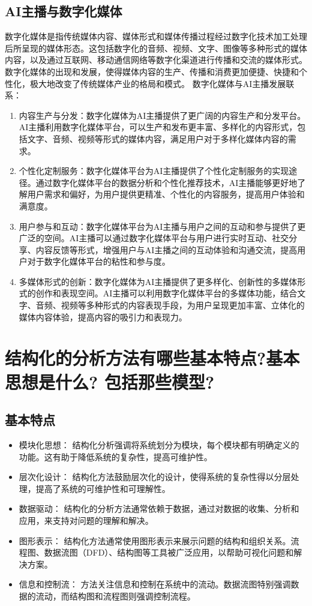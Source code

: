 \documentclass[11pt, a4paper, oneside]{ctexbook}
\begin{document}
\section{AI主播与数字化媒体}
数字化媒体是指传统媒体内容、媒体形式和媒体传播过程经过数字化技术加工处理后所呈现的媒体形态。这包括数字化的音频、视频、文字、图像等多种形式的媒体内容，以及通过互联网、移动通信网络等数字化渠道进行传播和交流的媒体形式。数字化媒体的出现和发展，使得媒体内容的生产、传播和消费更加便捷、快捷和个性化，极大地改变了传统媒体产业的格局和模式。
数字化媒体与AI主播发展联系：
\begin{enumerate}
    \item 内容生产与分发：数字化媒体为AI主播提供了更广阔的内容生产和分发平台。AI主播利用数字化媒体平台，可以生产和发布更丰富、多样化的内容形式，包括文字、音频、视频等形式的媒体内容，满足用户对于多样化媒体内容的需求。
    \item 个性化定制服务：数字化媒体平台为AI主播提供了个性化定制服务的实现途径。通过数字化媒体平台的数据分析和个性化推荐技术，AI主播能够更好地了解用户需求和偏好，为用户提供更精准、个性化的内容服务，提高用户体验和满意度。
    \item 用户参与和互动：数字化媒体平台为AI主播与用户之间的互动和参与提供了更广泛的空间。AI主播可以通过数字化媒体平台与用户进行实时互动、社交分享、内容反馈等形式，增强用户与AI主播之间的互动体验和沟通交流，提高用户对于数字化媒体平台的粘性和参与度。
    \item 多媒体形式的创新：数字化媒体为AI主播提供了更多样化、创新性的多媒体形式的创作和表现空间。AI主播可以利用数字化媒体平台的多媒体功能，结合文字、音频、视频等多种形式的内容表现手段，为用户呈现更加丰富、立体化的媒体内容体验，提高内容的吸引力和表现力。
\end{enumerate}
\chapter{结构化的分析方法有哪些基本特点?基本思想是什么? 包括那些模型?}
\section{基本特点}
\begin{itemize}
    \item 模块化思想： 结构化分析强调将系统划分为模块，每个模块都有明确定义的功能。这有助于降低系统的复杂性，提高可维护性。
    \item 层次化设计： 结构化方法鼓励层次化的设计，使得系统的复杂性得以分层处理，提高了系统的可维护性和可理解性。
    \item 数据驱动： 结构化的分析方法通常依赖于数据，通过对数据的收集、分析和应用，来支持对问题的理解和解决。
    \item 图形表示： 结构化方法通常使用图形表示来展示问题的结构和组织关系。流程图、数据流图（DFD）、结构图等工具被广泛应用，以帮助可视化问题和解决方案。
    \item 信息和控制流： 方法关注信息和控制在系统中的流动。数据流图特别强调数据的流动，而结构图和流程图则强调控制流程。
\end{itemize}
\end{document}
